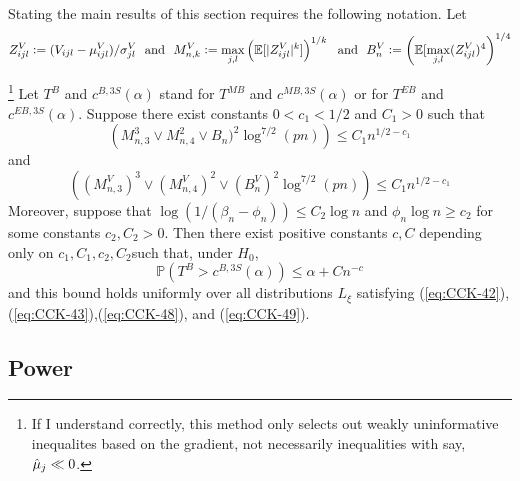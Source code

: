Stating the main results of this section requires the following notation. Let 
\[Z_{ijl}^V := (V_{ijl} - \mu_{ijl}^V)/\sigma_{jl}^V\hbox{ }\text{ and }\hbox{ }M_{n,k}^V := \max_{j,l} \left(\mathbb{E}[|Z_{ijl}^V|^k]\right)^{1/k}\hbox{ }\text{ and }\hbox{ }B_n^V :=\left(\mathbb{E}[\max_{j,l} (Z_{ijl}^V)^4\right)^{1/4}\]
\begin{theorem}\footnote{If I understand correctly, this method only selects out weakly uninformative inequalites based on the gradient, not necessarily inequalities with say, $\hat{\mu}_j \ll 0$.}
	\label{thm:CCK-4.6}
	Let $T^B$ and $c^{B,3S}(\alpha)$ stand for $T^{MB}$ and $c^{MB,3S}(\alpha)$ or for $T^{EB}$ and $c^{EB,3S}(\alpha)$. Suppose there exist constants $0 < c_1 < 1/2$ and $C_1 > 0$ such that 
	\begin{equation}
		\label{eq:CCK-48}
		\left(M_{n,3}^3 \vee M_{n,4}^2 \vee B_n)^2 \log^{7/2}(pn)\right) \leq C_1 n^{1/2 - c_1}
	\end{equation}
	and 
	\begin{equation}
		\label{eq:CCK-49}
		\left((M_{n,3}^V)^3 \vee (M_{n,4}^V)^2 \vee (B_n^V)^2 \log^{7/2}(pn)\right) \leq C_1 n^{1/2 - c_1}
	\end{equation}
	Moreover, suppose that $\log(1/(\beta_n -\phi_n)) \leq C_2 \log n$ and $\phi_n \log n \geq c_2$ for some constants $c_2, C_2 > 0$. Then there exist positive constants $c,C$ depending only on $c_1, C_1, c_2, C_2$such that, under $H_0$,
	\[\mathbb{P}(T^B > c^{B,3S}(\alpha))\leq \alpha + Cn^{-c}\]
	and this bound holds uniformly over all distributions $L_\xi$ satisfying (\ref{eq:CCK-42}),(\ref{eq:CCK-43}),(\ref{eq:CCK-48}), and (\ref{eq:CCK-49}).
\end{theorem}

\subsection{Power}


